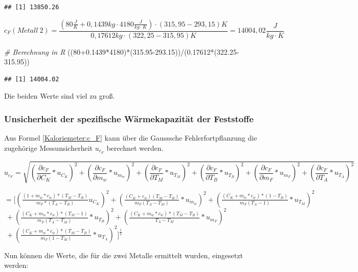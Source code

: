 \documentclass[
  9pt,
]{article}
\newenvironment{Shaded}{\begin{snugshade}}{\end{snugshade}}
\newcommand{\CommentTok}[1]{\textcolor[rgb]{0.56,0.35,0.01}{\textit{#1}}}
\newcommand{\DecValTok}[1]{\textcolor[rgb]{0.00,0.00,0.81}{#1}}
\newcommand{\FloatTok}[1]{\textcolor[rgb]{0.00,0.00,0.81}{#1}}
\newcommand{\NormalTok}[1]{#1}
\newcommand{\SpecialCharTok}[1]{\textcolor[rgb]{0.00,0.00,0.00}{#1}}
\begin{document}
\begin{verbatim}
## [1] 13850.26
\end{verbatim}

\[c_F(Metall\ 2) = \frac{(80\frac{J}{K}+0,1439kg\cdot 4180\frac{J}{kg\cdot K})\cdot (315,95-293,15)K}{0,17612kg\cdot(322,25-315,95)K}= 14004,02\frac{J}{kg\cdot K}\]

\begin{Shaded}
\begin{Highlighting}[]
\CommentTok{\# Berechnung in R}
\NormalTok{((}\DecValTok{80}\FloatTok{+0.1439}\SpecialCharTok{*}\DecValTok{4180}\NormalTok{)}\SpecialCharTok{*}\NormalTok{(}\FloatTok{315.95{-}293.15}\NormalTok{))}\SpecialCharTok{/}\NormalTok{(}\FloatTok{0.17612}\SpecialCharTok{*}\NormalTok{(}\FloatTok{322.25{-}315.95}\NormalTok{))}
\end{Highlighting}
\end{Shaded}

\begin{verbatim}
## [1] 14004.02
\end{verbatim}

Die beiden Werte sind viel zu groß.

\hypertarget{unsicherheit-der-spezifische-wuxe4rmekapazituxe4t-der-feststoffe}{%
\subsubsection{Unsicherheit der spezifische Wärmekapazität der
Feststoffe}\label{unsicherheit-der-spezifische-wuxe4rmekapazituxe4t-der-feststoffe}}

Aus Formel \ref{Kaloriemeter:c_F} kann über die Gausssche
Fehlerfortpflanzung die zugehörige Messunsicherheit \(u_{c_F}\)
berechnet werden.

\[u_{c_F}=\sqrt{(\frac{\partial c_F}{\partial C_K}*u_{C_K})^2+(\frac{\partial c_F}{\partial m_w}*u_{m_w})^2+(\frac{\partial c_F}{\partial T_M}*u_{T_M})^2+ (\frac{\partial c_F}{\partial T_B}*u_{T_B})^2+ (\frac{\partial c_F}{\partial m_F}*u_{m_F})^2+ (\frac{\partial c_F}{\partial T_A}*u_{T_A})^2}\]

\(=[(\frac{(1+m_w*c_w)*(T_M-T_B)}{m_F*(T_A-T_B)}u_{C_K})^2+(\frac{(C_K+c_w)(T_M-T_B)}{m_F(T_A-T_M)}*u_{m_w})^2+(\frac{(C_K+m_w*c_w)*(1-T_B)}{m_F(T_A-1)}*u_{T_M})^2\)
\(\ +(\frac{(C_K+m_w*c_w)*(T_M-1)}{m_F(T_A-T_M)}*u_{T_B})^2+(\frac{(C_K+m_w*c_w)*(T_M-T_B)}{T_A-T_M}*u_{m_F})^2\)
\(\ +(\frac{(C_K+m_w*c_w)*(T_M-T_B)}{m_F(1-T_M)}*u_{T_A})^2]^{\frac{1}{2}}\)

Nun können die Werte, die für die zwei Metalle ermittelt wurden,
eingesetzt werden:
\end{document}
